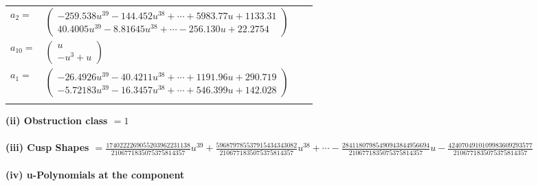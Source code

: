 \documentclass[1p]{elsarticle_modified}
\theoremstyle{definition}
\begin{document}
\begin{tabular}{m{7pt} m{180pt} m{7pt} m{180pt} }
\flushright $a_{2}=$&$\begin{pmatrix}-259.538 u^{39}-144.452 u^{38}+\cdots+5983.77 u+1133.31\\40.4005 u^{39}-8.81645 u^{38}+\cdots-256.130 u+22.2754\end{pmatrix}$ \\
\flushright $a_{10}=$&$\begin{pmatrix}u\\- u^3+u\end{pmatrix}$ \\
\flushright $a_{1}=$&$\begin{pmatrix}-26.4926 u^{39}-40.4211 u^{38}+\cdots+1191.96 u+290.719\\-5.72183 u^{39}-16.3457 u^{38}+\cdots+546.399 u+142.028\end{pmatrix}$\\&\end{tabular}
\flushleft \textbf{(ii) Obstruction class $= 1$}\\~\\
\flushleft \textbf{(iii) Cusp Shapes $= \frac{1740222269055203962231138}{2106771835075375814357} u^{39}+\frac{596879785537915434343082}{2106771835075375814357} u^{38}+\cdots-\frac{28411807985490943844956694}{2106771835075375814357} u-\frac{4240704910109983609293577}{2106771835075375814357}$}\\~\\
\newpage\renewcommand{\arraystretch}{1}
\flushleft \textbf{(iv) u-Polynomials at the component}\newline \\
\end{document}
